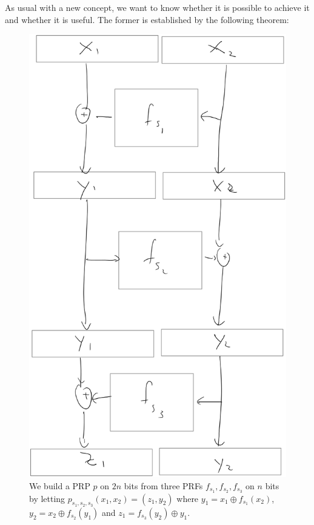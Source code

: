 As usual with a new concept, we want to know whether it is possible to
achieve it and whether it is useful. The former is established by the
following theorem:

\hypertarget{PRPfromPRF}{}

\begin{figure}
\centering
\includegraphics[width=\textwidth, height=0.25\paperheight, keepaspectratio]{../figure/feistel.jpg}
\caption{We build a PRP \(p\) on \(2n\) bits from three PRFs
\(f_{s_1},f_{s_2},f_{s_3}\) on \(n\) bits by letting
\(p_{s_1,s_2,s_3}(x_1,x_2)=(z_1,y_2)\) where
\(y_1 = x_1 \oplus f_{s_1}(x_2)\), \(y_2 = x_2 \oplus f_{s_2}(y_1)\) and
\(z_1 = f_{s_3}(y_2) \oplus y_1\).}
\label{feistelfig}
\end{figure}

